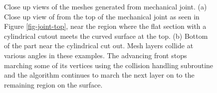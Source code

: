 \begin{figure}
\begin{subfigure}{.5\textwidth}
		\caption{}
		\label{closeUp2}
	\end{subfigure}
	\caption{Close up views of the meshes generated from mechanical joint. (a) Close up view of from the top of the mechanical joint as seen in Figure \ref{fig-joint-top}, near the region where the flat section with a cylindrical cutout meets the curved surface at the top. (b) Bottom of the part near the cylindrical cut out. Mesh layers collide at various angles in these examples. The advancing front stops marching some of its vertices using the collision handling subroutine and the algorithm continues to march the next layer on to the remaining region on the surface.}
	\label{fig-closeUp}
\end{figure}








